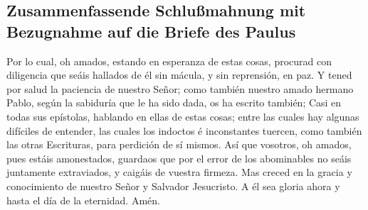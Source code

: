 \hypertarget{zusammenfassende-schluuxdfmahnung-mit-bezugnahme-auf-die-briefe-des-paulus}{%
\subsection{Zusammenfassende Schlußmahnung mit Bezugnahme auf die Briefe
des
Paulus}\label{zusammenfassende-schluuxdfmahnung-mit-bezugnahme-auf-die-briefe-des-paulus}}

 Por lo cual, oh amados, estando en esperanza de estas
cosas, procurad con diligencia que seáis hallados de él sin mácula, y
sin reprensión, en paz.  Y tened por salud la paciencia
de nuestro Señor; como también nuestro amado hermano Pablo, según la
sabiduría que le ha sido dada, os ha escrito también; 
Casi en todas sus epístolas, hablando en ellas de estas cosas; entre las
cuales hay algunas difíciles de entender, las cuales los indoctos é
inconstantes tuercen, como también las otras Escrituras, para perdición
de sí mismos.  Así que vosotros, oh amados, pues estáis
amonestados, guardaos que por el error de los abominables no seáis
juntamente extraviados, y caigáis de vuestra firmeza. 
Mas creced en la gracia y conocimiento de nuestro Señor y Salvador
Jesucristo. A él sea gloria ahora y hasta el día de la eternidad. Amén.
